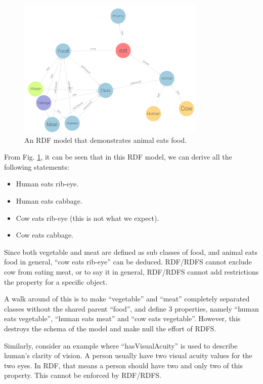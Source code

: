 \begin{figure}[htbp]
	\centering
	\includegraphics[width=0.8\textwidth]{./chapters/ch-semanticwebarchitecture/figures/coweatgrass.png}
	\caption{An RDF model that demonstrates animal eats food.}
	\label{fig:coweatgrass}
\end{figure}

From Fig. \ref{fig:coweatgrass}, it can be seen that in this RDF model, we can derive all the following statements:
\begin{itemize}
	\item Human eats rib-eye.
	\item Human eats cabbage.
	\item Cow eats rib-eye (this is not what we expect).
	\item Cow eats cabbage.
\end{itemize}
Since both vegetable and meat are defined as sub classes of food, and animal eats food in general, ``cow eats rib-eye'' can be deduced. RDF/RDFS cannot exclude cow from eating meat, or to say it in general, RDF/RDFS cannot add restrictions the property for a specific object.

A walk around of this is to make ``vegetable'' and ``meat'' completely separated classes without the shared parent ``food'', and define 3 properties, namely ``human eats vegetable'', ``human eats meat'' and ``cow eats vegetable''. However, this destroys the schema of the model and make null the effort of RDFS.

Similarly, consider an example where ``hasVisualAcuity'' is used to describe human's clarity of vision. A person usually have two visual acuity values for the two eyes. In RDF, that means a person should have two and only two of this property. This cannot be enforced by RDF/RDFS.

